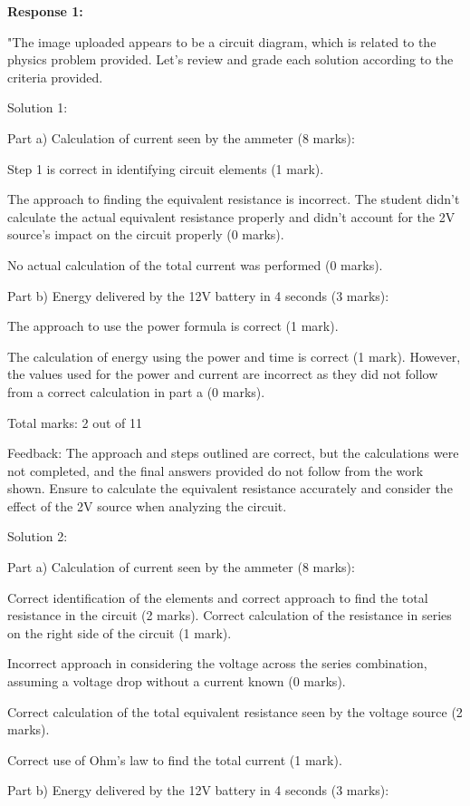 \documentclass[a4paper,11pt]{article}
\begin{document}
\textbf{Response 1:}

"The image uploaded appears to be a circuit diagram, which is related to the physics problem provided. Let's review and grade each solution according to the criteria provided.

Solution 1:

Part a) Calculation of current seen by the ammeter (8 marks):

Step 1 is correct in identifying circuit elements (1 mark).

The approach to finding the equivalent resistance is incorrect. The student didn't calculate the actual equivalent resistance properly and didn't account for the 2V source's impact on the circuit properly (0 marks).

No actual calculation of the total current was performed (0 marks).

Part b) Energy delivered by the 12V battery in 4 seconds (3 marks):

The approach to use the power formula is correct (1 mark).

The calculation of energy using the power and time is correct (1 mark).
However, the values used for the power and current are incorrect as they did not follow from a correct calculation in part a (0 marks).

Total marks: 2 out of 11

Feedback: The approach and steps outlined are correct, but the calculations were not completed, and the final answers provided do not follow from the work shown. Ensure to calculate the equivalent resistance accurately and consider the effect of the 2V source when analyzing the circuit.

Solution 2:

Part a) Calculation of current seen by the ammeter (8 marks):

Correct identification of the elements and correct approach to find the total resistance in the circuit (2 marks).
Correct calculation of the resistance in series on the right side of the circuit (1 mark).

Incorrect approach in considering the voltage across the series combination, assuming a voltage drop without a current known (0 marks).

Correct calculation of the total equivalent resistance seen by the voltage source (2 marks).

Correct use of Ohm's law to find the total current (1 mark).

Part b) Energy delivered by the 12V battery in 4 seconds (3 marks):
\end{document}
